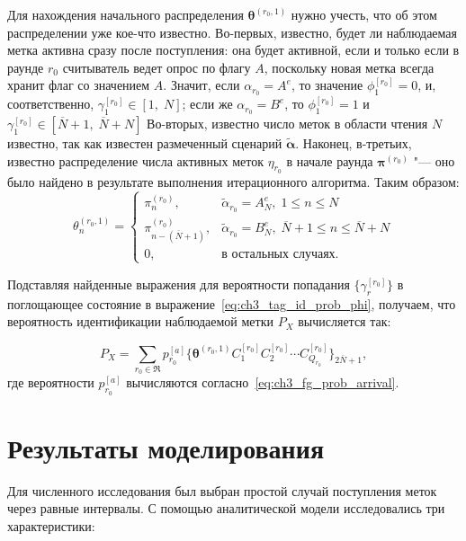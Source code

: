Для нахождения начального распределения $\bm{\theta}^{(r_0,1)}$ нужно учесть, что об этом распределении уже кое-что известно. Во-первых, известно, будет ли наблюдаемая метка активна сразу после поступления: она будет активной, если и только если в раунде $r_0$ считыватель ведет опрос по флагу $A$, поскольку новая метка всегда хранит флаг со значением $A$. Значит, если $\alpha_{r_0} = A^{e}$, то значение $\phi_1^{[r_0]} = 0$, и, соответственно, $\gamma_1^{[r_0]} \in [1,\; N]$; если же $\alpha_{r_0} = B^{e}$, то $\phi_1^{[r_0]} = 1$ и $\gamma_1^{[r_0]} \in [\overline{N} + 1,\; \overline{N} + N]$ Во-вторых, известно число меток в области чтения $N$ известно, так как известен размеченный сценарий $\widetilde{\bm{\alpha}}$. Наконец, в-третьих, известно распределение числа активных меток $\eta_{r_0}$ в начале раунда $\bm{\pi}^{(r_0)}$ "--- оно было найдено в результате выполнения итерационного алгоритма. Таким образом:
\begin{equation}\label{eq:ch3_fg_initial_prob}
	\theta_n^{(r_0,1)} = \begin{cases}
		\pi^{(r_0)}_n,                      &\widetilde{\alpha}_{r_0} = A^e_N,\; 1 \leqslant n \leqslant N\\
		\pi^{(r_0)}_{n - (\overline{N}+1)}, &\widetilde{\alpha}_{r_0} = B^e_N,\; \overline{N}+1 \leqslant n \leqslant \overline{N}+N\\
		0,                                  &\text{в остальных случаях.}
	\end{cases}
\end{equation}

Подставляя найденные выражения для вероятности попадания $\{ \gamma_r^{[r_0]} \}$ в поглощающее состояние в выражение~\eqref{eq:ch3_tag_id_prob_phi}, получаем, что вероятность идентификации наблюдаемой метки $P_X$ вычисляется так:

$$
	P_X = \sum\limits_{r_0 \in \mathfrak{R}} p_{r_0}^{[a]} \{ \bm{\theta}^{(r_0,1)} C_1^{[r_0]} C_2^{[r_0]} \cdots C_{Q_{r_0}}^{[r_0]} \}_{2\overline{N}+1},
$$
где вероятности $p_{r_0}^{[a]}$ вычисляются согласно~\eqref{eq:ch3_fg_prob_arrival}.






\section{Результаты моделирования}\label{sec:ch3_results}
Для численного исследования был выбран простой случай поступления меток через равные интервалы. С помощью аналитической модели исследовались три характеристики:

